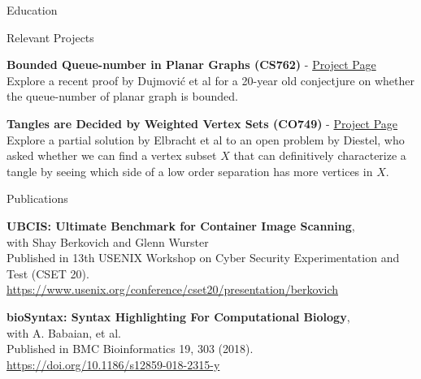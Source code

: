\documentclass{cv}
\begin{document}
\begin{rSection}{Education}
\begin{rSubsection}{Relevant Projects}{}{}{}	
	\item \textbf{Bounded Queue-number in Planar Graphs (CS762)} - \href{https://jeffreyhykam.com/writings/}{Project Page}\\
	Explore a recent proof by Dujmovi\'{c} et al for a 20-year old conjectjure on whether the queue-number of planar graph is bounded. \\

	\item \textbf{Tangles are Decided by Weighted Vertex Sets (CO749)} - \href{https://jeffreyhykam.com/writings/}{Project Page}\\
	Explore a partial solution by Elbracht et al to an open problem by Diestel, who asked whether we can find a vertex subset $X$ that can definitively characterize a tangle by seeing which side of a low order separation has more vertices in $X$. 
\end{rSubsection}
\end{rSection}

\begin{rSection}{Publications}
\begin{rSubsectionPure}
	\item \textbf{{UBCIS}: Ultimate Benchmark for Container Image Scanning}, \\
	with Shay Berkovich and Glenn Wurster \\
	Published in 13th {USENIX} Workshop on Cyber Security Experimentation and Test ({CSET} 20). \\
	\href{https://www.usenix.org/conference/cset20/presentation/berkovich}{https://www.usenix.org/conference/cset20/presentation/berkovich}
\end{rSubsectionPure}

\begin{rSubsectionPure}
	\item \textbf{bioSyntax: Syntax Highlighting For Computational Biology}, \\
	with A. Babaian, et al. \\
	Published in BMC Bioinformatics 19, 303 (2018). \\
	\href{https://doi.org/10.1186/s12859-018-2315-y}{https://doi.org/10.1186/s12859-018-2315-y}
\end{rSubsectionPure}
\end{rSection}
\end{document}
